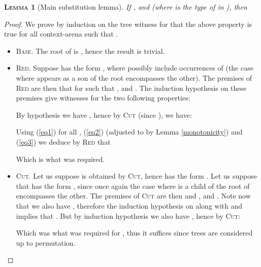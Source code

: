 \documentclass{article}
\newtheorem{lemma}{\textsc{Lemma}}
\begin{document}
\begin{lemma}[Main substitution lemma]
If ,  and  (where  is the type of  in ), then 
\label{main_substitution}
\end{lemma}
\begin{proof}
We prove by induction on the tree witness for  that the above property is true for all context-arena  such that .
\begin{itemize}
\item \textsc{Base.} The root of  is , hence the result is trivial.
\item \textsc{Red.} Suppose  has the form , where  possibly include occurrences of  (the case where  appears as a son
of the root encompasses the other). The premises of \textsc{Red} are then that for  such that
, 
and . The induction hypothesis on these premises give witnesses for the two following properties:


By hypothesis we have , hence by \textsc{Cut} (since ), we have:

Using (\ref{eq1}) for all , (\ref{eq2}) (adjusted to  by Lemma \ref{monotonicity}) and (\ref{eq3}) we deduce by \textsc{Red} that

Which is what was required.
\item \textsc{Cut.} Let us suppose  is obtained by \textsc{Cut}, hence  has the form . Let us suppose
that  has the form , since once again the case where  is a child of the root of  encompasses the other. The premises of \textsc{Cut} are then
 and , and . Note now that we also have , therefore
the induction hypothesis on  along with  and  implies that
. But by induction hypothesis we also have , hence by \textsc{Cut}:

Which was what was required for , thus it suffices since trees are considered up to permutation.
\end{itemize}
\end{proof}
\end{document}
